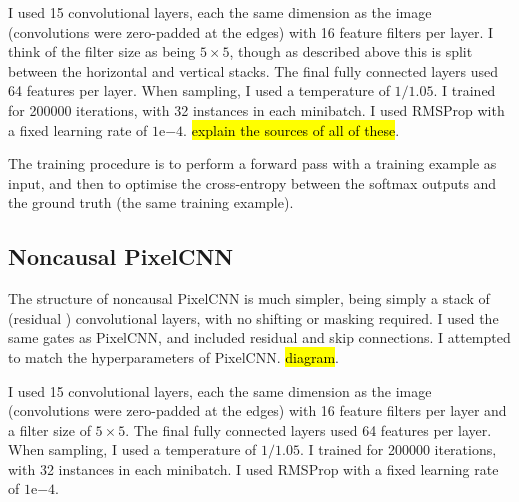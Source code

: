 \documentclass[10pt,a4paper]{article}
\begin{document}
I used 15 convolutional layers, each the same dimension as the image (convolutions were zero-padded at the edges) with 16 feature filters per layer. I think of the filter size as being $5\times 5$, though as described above this is split between the horizontal and vertical stacks. The final fully connected layers used 64 features per layer. When sampling, I used a temperature of $1/1.05$. I trained for 200000 iterations, with 32 instances in each minibatch. I used RMSProp with a fixed learning rate of $1\mathrm{e}{-4}$. \hl{explain the sources of all of these}.

The training procedure is to perform a forward pass with a training example as input, and then to optimise the cross-entropy between the softmax outputs and the ground truth (the same training example).

\subsection{Noncausal PixelCNN}

The structure of noncausal PixelCNN is much simpler, being simply a stack of (residual \cite{resnet}) convolutional layers, with no shifting or masking required. I used the same gates as PixelCNN, and included residual and skip connections. I attempted to match the hyperparameters of PixelCNN. \hl{diagram}.

I used 15 convolutional layers, each the same dimension as the image (convolutions were zero-padded at the edges) with 16 feature filters per layer and a filter size of $5\times 5$. The final fully connected layers used 64 features per layer. When sampling, I used a temperature of $1/1.05$. I trained for 200000 iterations, with 32 instances in each minibatch. I used RMSProp with a fixed learning rate of $1\mathrm{e}{-4}$.
\end{document}
